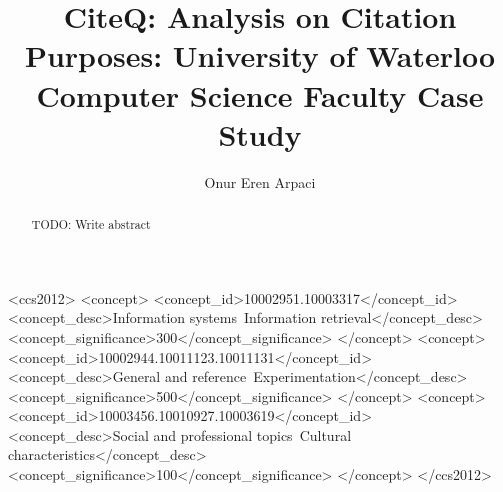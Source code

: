 \documentclass[sigconf]{acmart}
\begin{document}
\title{CiteQ: Analysis on Citation Purposes: University of Waterloo Computer Science Faculty Case Study} 

\author{Onur Eren Arpaci}

\renewcommand{\shortauthors}{Arpaci}

\begin{abstract}
  TODO: Write abstract
\end{abstract}

\begin{CCSXML}
    <ccs2012>
       <concept>
           <concept_id>10002951.10003317</concept_id>
           <concept_desc>Information systems~Information retrieval</concept_desc>
           <concept_significance>300</concept_significance>
           </concept>
       <concept>
           <concept_id>10002944.10011123.10011131</concept_id>
           <concept_desc>General and reference~Experimentation</concept_desc>
           <concept_significance>500</concept_significance>
           </concept>
       <concept>
           <concept_id>10003456.10010927.10003619</concept_id>
           <concept_desc>Social and professional topics~Cultural characteristics</concept_desc>
           <concept_significance>100</concept_significance>
           </concept>
     </ccs2012>
\end{CCSXML}
    
\end{document}
